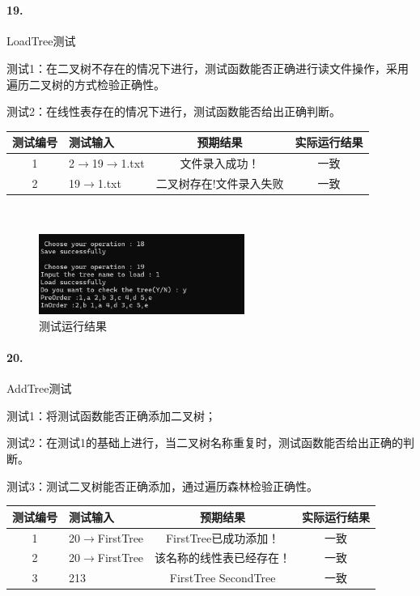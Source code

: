\documentclass[supercite]{Experimental_Report}
\theoremstyle{definition}
\begin{document}
~\

\paragraph{19.}LoadTree测试

测试1：在二叉树不存在的情况下进行，测试函数能否正确进行读文件操作，采用遍历二叉树的方式检验正确性。

测试2：在线性表存在的情况下进行，测试函数能否给出正确判断。

\vspace{0.5em}

\begin{tabular}{|c|p{2.7cm}|c|c|}
	\hline
	测试编号 & 测试输入 & 预期结果 & 实际运行结果 \\
	\hline
	1 & 2$\rightarrow$19$\rightarrow$1.txt & 文件录入成功！ & 一致 \\
	\hline
	2 & 19$\rightarrow$1.txt & 二叉树存在!文件录入失败 & 一致 \\
	\hline
\end{tabular}

~\

\begin{figure}[H]
 	\centering
 	\includegraphics[width=0.6\textwidth]{images/二叉树测试18_19.png}
 	\caption{测试运行结果}
 	\label{txlab}
 \end{figure}

\paragraph{20.}AddTree测试

测试1：将测试函数能否正确添加二叉树；

测试2：在测试1的基础上进行，当二叉树名称重复时，测试函数能否给出正确的判断。

测试3：测试二叉树能否正确添加，通过遍历森林检验正确性。

\vspace{0.5em}

\begin{tabular}{|c|p{2.7cm}|c|c|}
	\hline
	测试编号 & 测试输入 & 预期结果 & 实际运行结果 \\
	\hline
	1 & 20$\rightarrow$FirstTree & FirstTree已成功添加！ & 一致 \\
	\hline
	2 & 20$\rightarrow$FirstTree & 该名称的线性表已经存在！ & 一致 \\
	\hline
	3 & 213& FirstTree SecondTree & 一致 \\
	\hline
\end{tabular}
\end{document}
